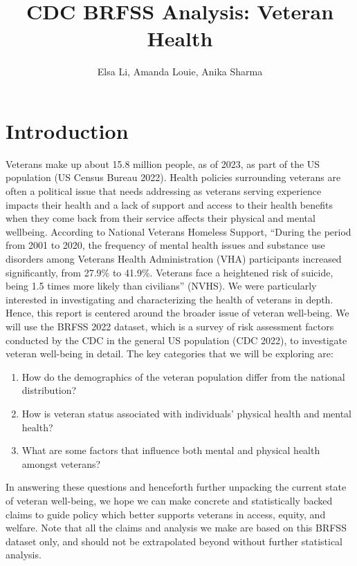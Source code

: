 \documentclass[
  10pt,
  letterpaper,
  DIV=11,
  numbers=noendperiod]{scrartcl}
\title{CDC BRFSS Analysis: Veteran Health}
\author{Elsa Li, Amanda Louie, Anika Sharma}
\date{}
\providecommand{\tightlist}{%
  \setlength{\itemsep}{0pt}\setlength{\parskip}{0pt}}
\begin{document}
\maketitle


\section{Introduction}\label{introduction}

Veterans make up about 15.8 million people, as of 2023, as part of the
US population (US Census Bureau 2022). Health policies surrounding
veterans are often a political issue that needs addressing as veterans
serving experience impacts their health and a lack of support and access
to their health benefits when they come back from their service affects
their physical and mental wellbeing. According to National Veterans
Homeless Support, ``During the period from 2001 to 2020, the frequency
of mental health issues and substance use disorders among Veterans
Health Administration (VHA) participants increased significantly, from
27.9\% to 41.9\%. Veterans face a heightened risk of suicide, being 1.5
times more likely than civilians'' (NVHS). We were particularly
interested in investigating and characterizing the health of veterans in
depth. Hence, this report is centered around the broader issue of
veteran well-being. We will use the BRFSS 2022 dataset, which is a
survey of risk assessment factors conducted by the CDC in the general US
population (CDC 2022), to investigate veteran well-being in detail. The
key categories that we will be exploring are:

\begin{enumerate}
\def\labelenumi{\arabic{enumi}.}
\tightlist
\item
  How do the demographics of the veteran population differ from the
  national distribution?
\item
  How is veteran status associated with individuals' physical health and
  mental health?
\item
  What are some factors that influence both mental and physical health
  amongst veterans?
\end{enumerate}

In answering these questions and henceforth further unpacking the
current state of veteran well-being, we hope we can make concrete and
statistically backed claims to guide policy which better supports
veterans in access, equity, and welfare. Note that all the claims and
analysis we make are based on this BRFSS dataset only, and should not be
extrapolated beyond without further statistical analysis.
\end{document}
